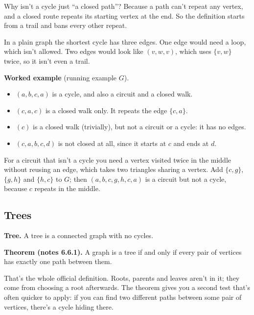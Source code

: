 Why isn't a cycle just ``a closed path''? Because a path can't repeat any vertex, and a closed route repeats its starting vertex at the end. So the definition starts from a trail and bans every other repeat.

In a plain graph the shortest cycle has three edges. One edge would need a loop, which isn't allowed. Two edges would look like $(v,w,v)$, which uses $\{v,w\}$ twice, so it isn't even a trail.

\textbf{Worked example} (running example $G$).
\begin{itemize}
\item $(a,b,c,a)$ is a cycle, and also a circuit and a closed walk.
\item $(c,a,c)$ is a closed walk only. It repeats the edge $\{c,a\}$.
\item $(c)$ is a closed walk (trivially), but not a circuit or a cycle: it has no edges.
\item $(c,a,b,c,d)$ is not closed at all, since it starts at $c$ and ends at $d$.
\end{itemize}
For a circuit that isn't a cycle you need a vertex visited twice in the middle without reusing an edge, which takes two triangles sharing a vertex. Add $\{c,g\}$, $\{g,h\}$ and $\{h,c\}$ to $G$; then $(a,b,c,g,h,c,a)$ is a circuit but not a cycle, because $c$ repeats in the middle.

\subsection{Trees}

\begin{notebox}
\textbf{Tree.} A tree is a connected graph with no cycles.

\textbf{Theorem (notes 6.6.1).} A graph is a tree if and only if every pair of vertices has exactly one path between them.
\end{notebox}

That's the whole official definition. Roots, parents and leaves aren't in it; they come from choosing a root afterwards. The theorem gives you a second test that's often quicker to apply: if you can find two different paths between some pair of vertices, there's a cycle hiding there.

